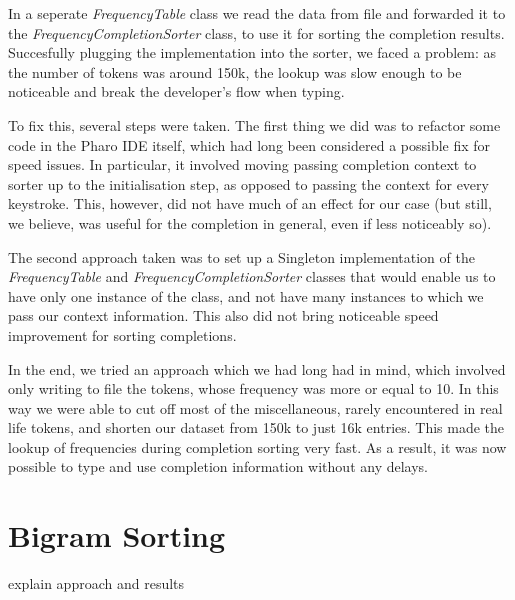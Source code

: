 In a seperate \textit{FrequencyTable} class we read the data from file and forwarded it to the \textit{FrequencyCompletionSorter} class, to use it for sorting the completion results. Succesfully plugging the implementation into the sorter, we faced a problem: as the number of tokens was around 150k, the lookup was slow enough to be noticeable and break the developer's flow when typing. 

To fix this, several steps were taken. The first thing we did was to refactor some code in the Pharo IDE itself, which had long been considered a possible fix for speed issues. In particular, it involved moving passing completion context to sorter up to the initialisation step, as opposed to passing the context for every keystroke. This, however, did not have much of an effect for our case (but still, we believe, was useful for the completion in general, even if less noticeably so).

The second approach taken was to set up a Singleton implementation of the \textit{FrequencyTable} and \textit{FrequencyCompletionSorter} classes that would enable us to have only one instance of the class, and not have many instances to which we pass our context information. This also did not bring noticeable speed improvement for sorting completions.

In the end, we tried an approach which we had long had in mind, which involved only writing to file the tokens, whose frequency was more or equal to 10. In this way we were able to cut off most of the miscellaneous, rarely encountered in real life tokens, and shorten our dataset from 150k to just 16k entries. This made the lookup of frequencies during completion sorting very fast. As a result, it was now possible to type and use completion information without any delays.

\section{Bigram Sorting}
explain approach and results